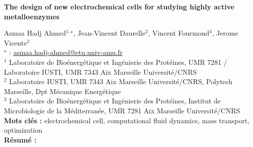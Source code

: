 


    \newpage

\BgThispage

%
\begin{flushleft}
\addtocounter{section}{1}
{\Large \textbf{The design of new electrochemical cells for studying highly active metalloenzymes}}\label{ref:66}
\end{flushleft}
%
Asmaa Hadj Ahmed$^{1,\star}$, Jean-Vincent Daurelle$^{2}$, Vincent Fourmond$^{3}$, Jerome Vicente$^{2}$\\[2mm]
$^{\star}$ \Letter : \url{asmaa.hadj-ahmed@etu.univ-amu.fr}\\[2mm]
{\footnotesize $^{1}$ Laboratoire de Bioénergétique et Ingénierie des Protéines, UMR 7281 / Laboratoire IUSTI, UMR 7343 Aix Marseille Université/CNRS}\\
{\footnotesize $^{2}$ Laboratoire IUSTI, UMR 7343 Aix Marseille Université/CNRS, Polytech Marseille, Dpt Mécanique Energétique}\\
{\footnotesize $^{3}$ Laboratoire de Bioénergétique et Ingénierie des Protéines, Institut de Microbiologie de la Méditerranée, UMR 7281 Aix Marseille Université/CNRS}\\
[4mm]
%
\noindent \textbf{Mots clés : } electrochemical cell, computational fluid dynamics, mass transport, optimization\\[4mm]
%
\noindent \textbf{Résumé : } 

